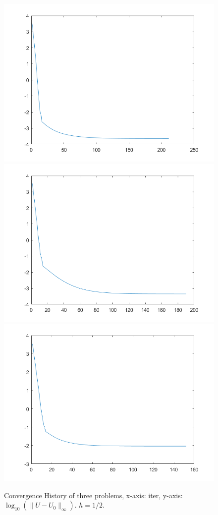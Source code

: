 \documentclass{article}
\begin{document}
\begin{figure}[H]
	\caption{Convergence History of three problems, x-axis: iter, y-axis: $\log_{10}(\|U-U_0\|_{\infty})$. $h = 1/2$.}
	\includegraphics[scale=.3]{../fig/q1_2.png}
	\includegraphics[scale=.3]{../fig/q2_2.png}
	\includegraphics[scale=.3]{../fig/q3_2.png}
\end{figure}
\end{document}
